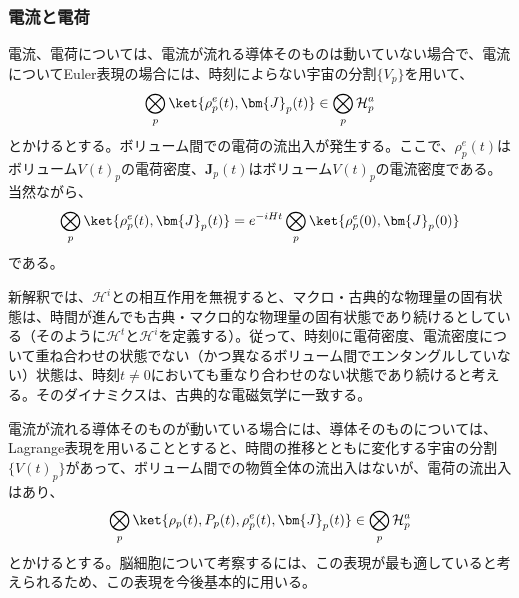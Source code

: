\subsubsection{電流と電荷}
電流、電荷については、電流が流れる導体そのものは動いていない場合で、電流についてEuler表現の場合には、時刻によらない宇宙の分割$\{V_p\}$を用いて、
\begin{equation}
    \label{eq:electric_current_state}
    \bigotimes_p \ket{\rho^e_p(t),\bm{J}_p(t)} \in \bigotimes_p \mathcal{H}_p^a
\end{equation}
とかけるとする。ボリューム間での電荷の流出入が発生する。ここで、$\rho^e_p(t)$はボリューム$V(t)_p$の電荷密度、$\bm{J}_p(t)$はボリューム$V(t)_p$の電流密度である。
当然ながら、
\begin{equation}
    \bigotimes_p \ket{\rho^e_p(t),\bm{J}_p(t)} = e^{-iHt}\bigotimes_p \ket{\rho_p^e(0),\bm{J}_p(0)}
\end{equation}
である。\par
新解釈では、$\mathcal{H}^i$との相互作用を無視すると、マクロ・古典的な物理量の固有状態は、時間が進んでも古典・マクロ的な物理量の固有状態であり続けるとしている（そのように$\mathcal{H}^t$と$\mathcal{H}^i$を定義する）。従って、時刻$0$に電荷密度、電流密度について重ね合わせの状態でない（かつ異なるボリューム間でエンタングルしていない）状態は、時刻$t \neq 0$においても重なり合わせのない状態であり続けると考える。そのダイナミクスは、古典的な電磁気学に一致する。\par
電流が流れる導体そのものが動いている場合には、導体そのものについては、Lagrange表現を用いることとすると、時間の推移とともに変化する宇宙の分割$\{V(t)_p\}$があって、ボリューム間での物質全体の流出入はないが、電荷の流出入はあり、
\begin{equation}
    \label{eq:electric_current_state}
    \bigotimes_p \ket{\rho_p(t),P_p(t),\rho^e_p(t),\bm{J}_p(t)} \in \bigotimes_p \mathcal{H}_p^a
\end{equation}
とかけるとする。脳細胞について考察するには、この表現が最も適していると考えられるため、この表現を今後基本的に用いる。
